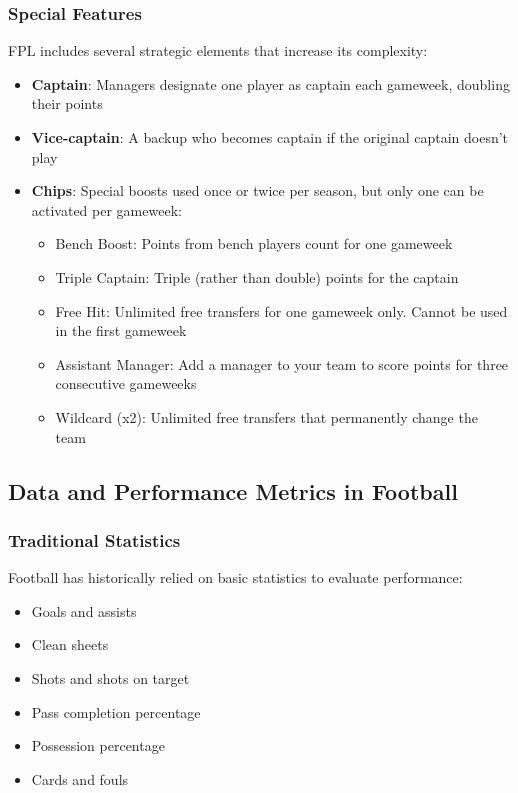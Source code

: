 \subsubsection{Special Features} \label{ch:special_features}

FPL includes several strategic elements that increase its complexity:
\begin{itemize}
    \item \textbf{Captain}: Managers designate one player as captain each gameweek, doubling their points
    \item \textbf{Vice-captain}: A backup who becomes captain if the original captain doesn't play
    \item \textbf{Chips}: Special boosts used once or twice per season, but only one can be activated per gameweek:
    \begin{itemize}
        \item Bench Boost: Points from bench players count for one gameweek
        \item Triple Captain: Triple (rather than double) points for the captain
        \item Free Hit: Unlimited free transfers for one gameweek only. Cannot be used in the first gameweek
        \item Assistant Manager: Add a manager to your team to score points for three consecutive gameweeks
        \item Wildcard (x2): Unlimited free transfers that permanently change the team \cite{fpl2024rules}
    \end{itemize}
\end{itemize}

\subsection{Data and Performance Metrics in Football}

\subsubsection{Traditional Statistics}

Football has historically relied on basic statistics to evaluate performance:
\begin{itemize}
    \item Goals and assists
    \item Clean sheets
    \item Shots and shots on target
    \item Pass completion percentage
    \item Possession percentage
    \item Cards and fouls \cite{hughes2005}
\end{itemize}

